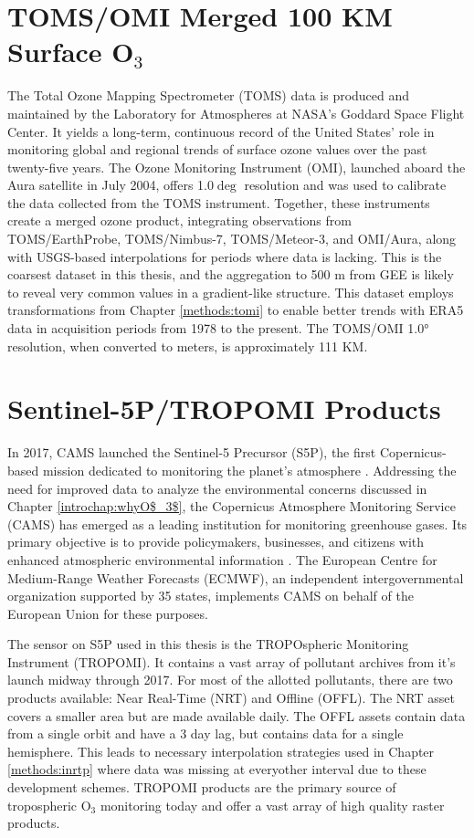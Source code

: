 \section{TOMS/OMI Merged 100 KM Surface O$_3$} \label{tmas:era5} The Total Ozone Mapping Spectrometer (TOMS) data is produced and maintained by the Laboratory for Atmospheres at NASA's Goddard Space Flight Center. It yields a long-term, continuous record of the United States’ role in monitoring global and regional trends of surface ozone values over the past twenty-five years. The Ozone Monitoring Instrument (OMI), launched aboard the Aura satellite in July 2004, offers 1.0$\deg$ resolution and was used to calibrate the data collected from the TOMS instrument. Together, these instruments create a merged ozone product, integrating observations from TOMS/EarthProbe, TOMS/Nimbus-7, TOMS/Meteor-3, and OMI/Aura, along with USGS-based interpolations for periods where data is lacking. This is the coarsest dataset in this thesis, and the aggregation to 500 m from GEE is likely to reveal very common values in a gradient-like structure. This dataset employs transformations from Chapter \ref{methods:tomi} to enable better trends with ERA5 data in acquisition periods from 1978 to the present. The TOMS/OMI \ang{1.0} resolution, when converted to meters, is approximately 111 KM.
\section{Sentinel-5P/TROPOMI Products} \label{tmas:S5P} In 2017, CAMS launched the Sentinel-5 Precursor (S5P), the first Copernicus-based mission dedicated to monitoring the planet’s atmosphere \parencite{veefkind2012}. Addressing the need for improved data to analyze the environmental concerns discussed in Chapter \ref{introchap:whyO$_3$}, the Copernicus Atmosphere Monitoring Service (CAMS) has emerged as a leading institution for monitoring greenhouse gases. Its primary objective is to provide policymakers, businesses, and citizens with enhanced atmospheric environmental information \parencite{petetin_model_2021}. The European Centre for Medium-Range Weather Forecasts (ECMWF), an independent intergovernmental organization supported by 35 states, implements CAMS on behalf of the European Union for these purposes.

The sensor on S5P used in this thesis is the TROPOspheric Monitoring Instrument (TROPOMI). It contains a vast array of pollutant archives from it's launch midway through 2017. For most of the allotted pollutants, there are two products available: Near Real-Time (NRT) and Offline (OFFL). The NRT asset covers a smaller area but are made available daily. The OFFL assets contain data from a single orbit and have a 3 day lag, but contains data for a single hemisphere. This leads to necessary interpolation strategies used in Chapter \ref{methods:inrtp} where data was missing at everyother interval due to these development schemes. TROPOMI products are the primary source of tropospheric O$_3$ monitoring today \parencite{keppens2024} and offer a vast array of high quality raster products. 

